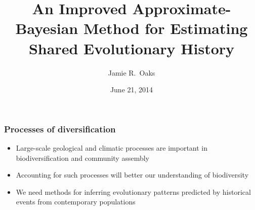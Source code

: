 

\newcommand{\allParameters}[1]{\ensuremath{\theta_{#1}}\xspace}


\title[Estimating shared history]{An Improved Approximate-Bayesian Method for Estimating Shared
Evolutionary History}

\author[J.\ Oaks]{
    Jamie R.\ Oaks
}

\date{June 21, 2014}


\maketitle




\begin{frame}
    \frametitle{Processes of diversification}
        \begin{itemize}
            \item<1-> Large-scale geological and climatic processes are
                important in biodiversification and community assembly
            \item<2-> Accounting for such processes will better our
                understanding of biodiversity
            \item<3-> We need methods for inferring evolutionary patterns
                predicted by historical events from contemporary populations
        \end{itemize}
\end{frame}



